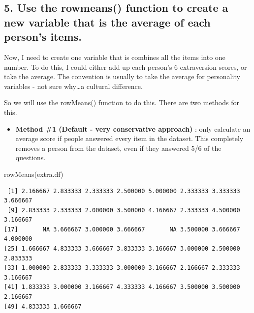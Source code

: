\documentclass[
  letterpaper,
  DIV=11,
  numbers=noendperiod,
  oneside]{scrreprt}
\newenvironment{Shaded}{\begin{snugshade}}{\end{snugshade}}
\newcommand{\FunctionTok}[1]{\textcolor[rgb]{0.28,0.35,0.67}{#1}}
\newcommand{\NormalTok}[1]{\textcolor[rgb]{0.00,0.23,0.31}{#1}}
\providecommand{\tightlist}{%
  \setlength{\itemsep}{0pt}\setlength{\parskip}{0pt}}\usepackage{longtable,booktabs,array}
\begin{document}
\subsection{5. Use the rowmeans() function to create a new variable that
is the average of each person's
items.}\label{use-the-rowmeans-function-to-create-a-new-variable-that-is-the-average-of-each-persons-items.}

Now, I need to create one variable that is combines all the items into
one number. To do this, I could either add up each person's 6
extraversion scores, or take the average. The convention is usually to
take the average for personality variables - not sure why\ldots a
cultural difference.

So we will use the rowMeans() function to do this. There are two methods
for this.

\begin{itemize}
\tightlist
\item
  \textbf{Method \#1 (Default - very conservative approach)} : only
  calculate an average score if people answered every item in the
  dataset. This completely removes a person from the dataset, even if
  they answered 5/6 of the questions.
\end{itemize}

{}

\begin{Shaded}
\begin{Highlighting}[]
    \FunctionTok{rowMeans}\NormalTok{(extra.df) }
\end{Highlighting}
\end{Shaded}

\begin{verbatim}
 [1] 2.166667 2.833333 2.333333 2.500000 5.000000 2.333333 3.333333 3.666667
 [9] 2.833333 2.333333 2.000000 3.500000 4.166667 2.333333 4.500000 3.166667
[17]       NA 3.666667 3.000000 3.666667       NA 3.500000 3.666667 4.000000
[25] 1.666667 4.833333 3.666667 3.833333 3.166667 3.000000 2.500000 2.833333
[33] 1.000000 2.833333 3.333333 3.000000 3.166667 2.166667 2.333333 3.166667
[41] 1.833333 3.000000 3.166667 4.333333 4.166667 3.500000 3.500000 2.166667
[49] 4.833333 1.666667
\end{verbatim}
\end{document}
